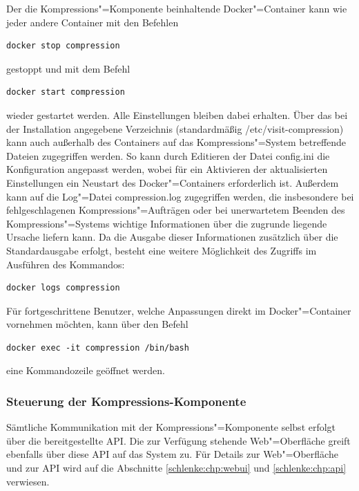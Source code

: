Der die Kompressions"=Komponente beinhaltende Docker"=Container kann wie jeder andere Container mit den Befehlen
\begin{lstlisting}[caption={Kommando zum Beenden des Docker-Containers der Kompressions-Komponente},label=schlenke:lst:dockerstop]
docker stop compression
\end{lstlisting}
gestoppt und mit dem Befehl
\begin{lstlisting}[caption={Kommando zum Starten des Docker-Containers der Kompressions-Komponente}]
docker start compression
\end{lstlisting}
wieder gestartet werden. Alle Einstellungen bleiben dabei erhalten. Über das bei der Installation angegebene Verzeichnis (standardmäßig {\ttfamily /etc/visit-compression}) kann auch außerhalb des Containers auf das Kompressions"=System betreffende Dateien zugegriffen werden. So kann durch Editieren der Datei {\ttfamily config.ini} die Konfiguration angepasst werden, wobei für ein Aktivieren der aktualisierten Einstellungen ein Neustart des Docker"=Containers erforderlich ist. Außerdem kann auf die Log"=Datei {compression.log} zugegriffen werden, die insbesondere bei fehlgeschlagenen Kompressions"=Aufträgen oder bei unerwartetem Beenden des Kompressions"=Systems wichtige Informationen über die zugrunde liegende Ursache liefern kann. Da die Ausgabe dieser Informationen zusätzlich über die Standardausgabe erfolgt, besteht eine weitere Möglichkeit des Zugriffs im Ausführen des Kommandos:
\begin{lstlisting}[caption={Kommando zum Anzeigen der Ausgaben des Kompressions-Systems}]
docker logs compression
\end{lstlisting}
Für fortgeschrittene Benutzer, welche Anpassungen direkt im Docker"=Container vornehmen möchten, kann über den Befehl
\begin{lstlisting}[caption={Befehl zum Öffnen einer Kommandozeile im Kompressions-Container}]
docker exec -it compression /bin/bash
\end{lstlisting}
eine Kommandozeile geöffnet werden.

\subsubsection{Steuerung der Kompressions-Komponente}
\label{schlenke:chp:componentcontrol}

Sämtliche Kommunikation mit der Kompressions"=Komponente selbst erfolgt über die bereitgestellte API. Die zur Verfügung stehende Web"=Oberfläche greift ebenfalls über diese API auf das System zu. Für Details zur Web"=Oberfläche und zur API wird auf die Abschnitte \ref{schlenke:chp:webui} und \ref{schlenke:chp:api} verwiesen.

